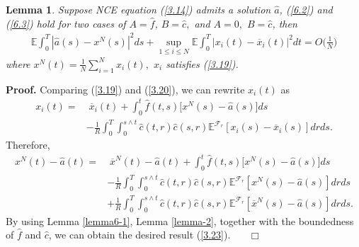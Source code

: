 \documentclass[11pt]{article}
\newenvironment{proof}[1][Proof]{\noindent \textbf{#1.} }{\ \ \  $\Box$}
\newtheorem{lemma}{Lemma}[section]
\def\dbE{\mathbb{E}}
\begin{document}
\begin{lemma}\label{lemma-3}
Suppose NCE equation (\ref{3.14}) admits a solution $\widehat{a}$,
(\ref{6.2}) and (\ref{6.3}) hold for two cases of $A=\widehat{f}$,
$B=\widehat{c},$ and $A=0,$ $B=\widehat{c}$, then
\begin{eqnarray}\label{3.23}
\dbE\int_0^T|\widehat{a}(s)-x^{N}(s)|^2ds+\sup\limits_{1\leq i\leq
N}\dbE\int_0^T|x_i(t)-\overline{x}_i(t)|^2dt=O\Big(\frac 1 N\Big)
\end{eqnarray}
where $x^{N}(t)=\frac{1}{N}\sum\limits_{i=1}^{N}x_{i}(t),$ $x_i$
satisfies (\ref{3.19}).
\end{lemma}
\begin{proof}
Comparing (\ref{3.19}) and (\ref{3.20}), we can rewrite $x_i(t)$ as
%
\begin{align*}
x_i(t)=& \; \overline{x}_i(t)+\int_0^t\widehat{f}(t,s)\Big[x^{N}(s)-\widehat{a}(s)\Big]ds \\
&-\frac{1}{R}\int_0^T\int_0^{s\wedge t}\widehat{c}(t,r)\widehat{c}(s,r)\dbE^{\mathcal{F}_r}[x_i(s)-\overline{x}_i(s)]drds.
\end{align*}
%
Therefore,
%
\begin{align*}
x^{N}(t)-\widehat{a}(t)=& \; \overline{x}^{N}(t)-\widehat{a}(t)+\int_0^t\widehat{f}(t,s)\Big[x^{N}(s)-\widehat{a}(s)\Big]ds\nonumber\\
& - \frac 1 R \int_0^T\int_0^{s\wedge
t}\widehat{c}(t,r)\widehat{c}(s,r)\dbE^{\mathcal{F}_r}[x^N(s)-\widehat{a}(s)]drds\nonumber\\
&+\frac 1 R \int_0^T\int_0^{s\wedge t}\widehat{c}(t,r)\widehat{c}(s,r)\dbE^{\mathcal{F}_r}[\overline{x}^N(s)-\widehat{a}(s)]drds.
\end{align*}
%
By using Lemma \ref{lemma6-1}, Lemma \ref{lemma-2}, together with
the boundedness of $\widehat{f}$ and $\widehat{c}$, we can obtain
the desired result (\ref{3.23}).
\hfill
\end{proof}
\end{document}
